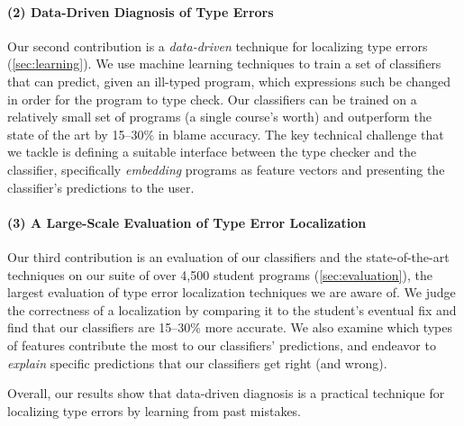 \paragraph{\textbf{(2) Data-Driven Diagnosis of Type Errors}}
Our second contribution is a \emph{data-driven} technique for localizing
type errors (\autoref{sec:learning}).
%
We use machine learning techniques to train a set of classifiers that can
predict, given an ill-typed program, which expressions such be changed
in order for the program to type check.
%
Our classifiers can be trained on a relatively small set of programs
(\ie a single course's worth) and outperform the state of the art by
15--30\% in blame accuracy.
%
The key technical challenge that we tackle is defining a suitable
interface between the type checker and the classifier, specifically
\emph{embedding} programs as feature vectors and presenting the
classifier's predictions to the user.

\paragraph{\textbf{(3) A Large-Scale Evaluation of Type Error Localization}}
Our third contribution is an evaluation of our classifiers and the
state-of-the-art techniques on our suite of over 4,500 student programs
(\autoref{sec:evaluation}), the largest evaluation of type error
localization techniques we are aware of.
%
We judge the correctness of a localization by comparing it to the
student's eventual fix and find that our classifiers are 15--30\% more
accurate.
%
We also examine which types of features contribute the most to our
classifiers' predictions, and endeavor to \emph{explain} specific
predictions that our classifiers get right (and wrong).

Overall, our results show that data-driven diagnosis is a practical
technique for localizing type errors by learning from past mistakes.
%

